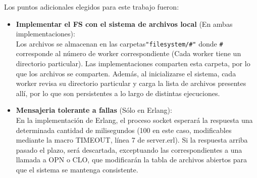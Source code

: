 \documentclass[a4paper, 11pt]{article}
\begin{document}
Los puntos adicionales elegidos para este trabajo fueron:
\begin{itemize}
 \item \textbf{Implementar el FS con el sistema de archivos local} (En ambas implementaciones): \\
   Los archivos se almacenan en las carpetas\verb!"filesystem/#"! donde \verb!#! corresponde al número de worker correspondiente (Cada worker tiene un directorio particular). Las implementaciones comparten esta carpeta, por lo que los archivos se comparten. Además, al inicializarse el sistema, cada worker revisa su directorio particular y carga la lista de archivos presentes allí, por lo que son persistentes a lo largo de distintas ejecuciones.

 \item \textbf{Mensajeria tolerante a fallas} (Sólo en Erlang):\\
 En la implementación de Erlang, el proceso socket esperará la respuesta una determinada cantidad de milisegundos (100 en este caso, modificables mediante la macro TIMEOUT, línea 7 de server.erl). Si la respuesta arriba pasado el plazo, será descartada, exceptuando las correspondientes a una llamada a OPN o CLO, que modificarán la tabla de archivos abiertos para que el sistema se mantenga consistente.
\end{itemize}
\end{document}
